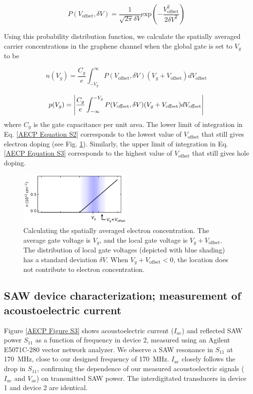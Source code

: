 \documentclass[double,12pt,1in,seploa]{beavtex}
\let\Oldsubsection\subsection
\renewcommand{\subsection}{\FloatBarrier\Oldsubsection}
\begin{document}
\begin{equation}
    P(V_{\mathrm{offset}}, \delta V) = \frac{1}{\sqrt{2 \pi}\delta V}\mathrm{exp}\left(-\frac{V_{\mathrm{offset}}^2}{2\delta V^2}\right)
    \label{AECP Equation S1}
\end{equation}

Using this probability distribution function, we calculate the spatially averaged carrier concentrations in the graphene channel when the global gate is set to $V_g$ to be


\begin{equation}
    n(V_g) = \frac{C_g}{e}\int_{-V_g}^{\infty}P(V_{\mathrm{offset}}, \delta V)(V_g + V_{\mathrm{offset}})dV_{\mathrm{offset}}
    \label{AECP Equation S2}
\end{equation}

\begin{equation}
    p(V_g) = \abs{\frac{C_g}{e}\int_{-\infty}^{-V_g}P(V_{\mathrm{offset}}, \delta V)(V_g + V_{\mathrm{offset}})dV_{\mathrm{offset}}}
    \label{AECP Equation S3}
\end{equation}
where $C_g$ is the gate capacitance per unit area. The lower limit of integration in Eq. \ref{AECP Equation S2} corresponds to the lowest value of $V_{\mathrm{offset}}$ that still gives electron doping (see Fig. \ref{AECP Figure S2}). Similarly, the upper limit of integration in Eq. \ref{AECP Equation S3} corresponds to the highest value of $V_{\mathrm{offset}}$ that still gives hole doping.

\begin{figure}
    \includegraphics[width = 0.5\textwidth]{Figure S2, V_offset.png}
    \caption{Calculating the spatially averaged electron concentration. The average gate voltage is $V_g$, and the local gate voltage is $V_g + V_{\mathrm{offset}}$. The distribution of local gate voltages (depicted with blue shading) has a standard deviation $\delta V$. When $V_g + V_{\mathrm{offset}} < 0$, the location does not contribute to electron concentration.}
    \label{AECP Figure S2}
\end{figure}

\subsection{SAW device characterization; measurement of acoustoelectric current} 
Figure \ref{AECP Figure S3} shows acoustoelectric current ($I_{ae}$) and reflected SAW power $S_{11}$ as a function of frequency in device 2, measured using an Agilent E5071C-280 vector network analyzer. We observe a SAW resonance in $S_{11}$ at \SI{170}{\mega\hertz}, close to our designed frequency of \SI{170}{\mega\hertz}.  $I_{ae}$ closely follows the drop in $S_{11}$, confirming the dependence of our measured acoustoelectric signals ($I_{ae}$ and $V_{\mathrm{ae}}$) on transmitted SAW power. The interdigitated transducers in device 1 and device 2 are identical.
\end{document}
